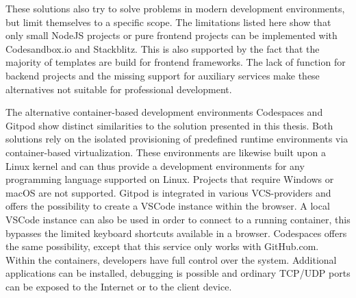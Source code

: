         These solutions also try to solve problems in modern development environments, but limit themselves to a specific scope. The limitations listed here show that only small NodeJS projects or pure frontend projects can be implemented with Codesandbox.io and Stackblitz. This is also supported by the fact that the majority of templates are build for frontend frameworks. The lack of function for backend projects and the missing support for auxiliary services make these alternatives not suitable for professional development.

        The alternative container-based development environments Codespaces and Gitpod show distinct similarities to the solution presented in this thesis. Both solutions rely on the isolated provisioning of predefined runtime environments via container-based virtualization. These environments are likewise built upon a Linux kernel and can thus provide a development environments for any programming language supported on Linux. Projects that require Windows or macOS are not supported.\newline
        Gitpod is integrated in various \ac{VCS}-providers and offers the possibility to create a \ac{VSCode} instance within the browser. A local \ac{VSCode} instance can also be used in order to connect to a running container, this bypasses the limited keyboard shortcuts available in a browser. Codespaces offers the same possibility, except that this service only works with GitHub.com. Within the containers, developers have full control over the system. Additional applications can be installed, debugging is possible and ordinary TCP/UDP ports can be exposed to the Internet or to the client device.\newline
